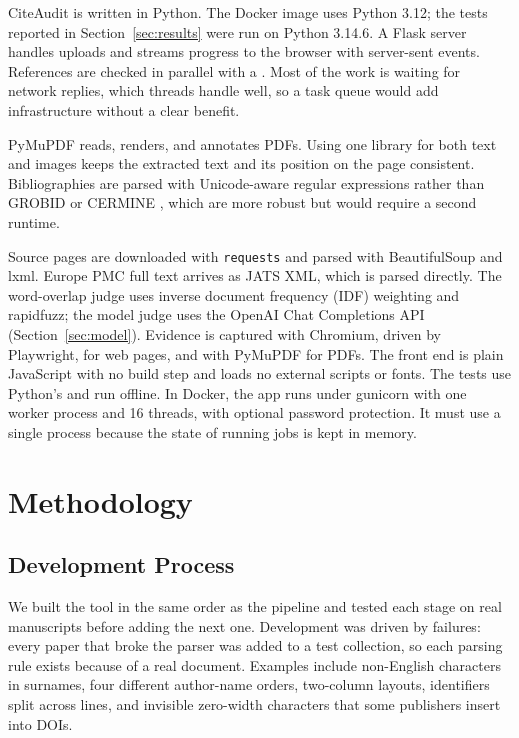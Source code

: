 \documentclass{article}
\newcommand{\vd}[1]{\texttt{\detokenize{#1}}}
\begin{document}
CiteAudit is written in Python. The Docker image uses Python 3.12; the tests reported in Section~\ref{sec:results} were run on Python 3.14.6. A Flask server handles uploads and streams progress to the browser with server-sent events. References are checked in parallel with a \vd{ThreadPoolExecutor}. Most of the work is waiting for network replies, which threads handle well, so a task queue would add infrastructure without a clear benefit.

PyMuPDF reads, renders, and annotates PDFs. Using one library for both text and images keeps the extracted text and its position on the page consistent. Bibliographies are parsed with Unicode-aware regular expressions rather than GROBID \cite{lopez2009} or CERMINE \cite{tkaczyk2015}, which are more robust but would require a second runtime.

Source pages are downloaded with \texttt{requests} and parsed with BeautifulSoup and lxml. Europe PMC full text arrives as JATS XML, which is parsed directly. The word-overlap judge uses inverse document frequency (IDF) weighting and rapidfuzz; the model judge uses the OpenAI Chat Completions API (Section~\ref{sec:model}). Evidence is captured with Chromium, driven by Playwright, for web pages, and with PyMuPDF for PDFs. The front end is plain JavaScript with no build step and loads no external scripts or fonts. The tests use Python's \vd{unittest} and run offline. In Docker, the app runs under gunicorn with one worker process and 16 threads, with optional password protection. It must use a single process because the state of running jobs is kept in memory.


\section{Methodology}
\label{sec:method}

\subsection{Development Process}

We built the tool in the same order as the pipeline and tested each stage on real manuscripts before adding the next one. Development was driven by failures: every paper that broke the parser was added to a test collection, so each parsing rule exists because of a real document. Examples include non-English characters in surnames, four different author-name orders, two-column layouts, identifiers split across lines, and invisible zero-width characters that some publishers insert into DOIs.
\end{document}
